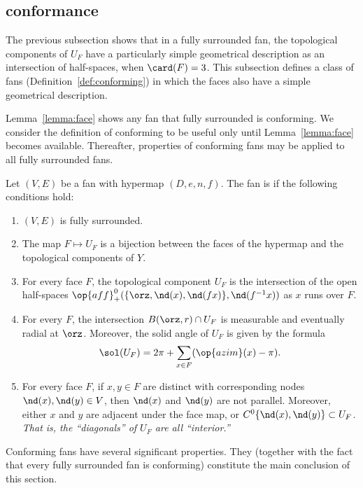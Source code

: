 \subsection{conformance}\label{sec:conformance}


The previous subsection shows that in a fully surrounded fan, the topological
components of $U_F$ have a particularly simple geometrical description as
an intersection of half-spaces, when $\card(F)=3$.  This subsection defines
a class of fans (Definition~\ref{def:conforming}) in which the faces also have
a  simple geometrical description.

Lemma~\ref{lemma:face} shows any fan that fully surrounded is
conforming.  We consider the definition of conforming to be
useful only until Lemma~\ref{lemma:face} becomes available.
Thereafter, properties of conforming fans may be applied to all fully
surrounded fans.

\begin{definition}[conforming]\label{def:conforming}
Let $(V,E)$ be a fan with hypermap $(D,e,n,f)$.  The fan is
 if the following conditions hold:
\begin{enumerate}
\item {} $(V,E)$ is fully surrounded.
\item {} The map $F\mapsto U_F$ is a bijection between
the faces of the hypermap and the topological components of $Y$.
\item {} For every face $F$, the topological component
$U_F$ is the intersection of the open half-spaces
$\op{aff}_+^0(\{\orz,\nd(x),\nd({f x})\},\nd(f^{-1} x))$ as $x$ runs over
$F$.\label{halfspace:conformance}
\item {} For every $F$, the intersection
$B(\orz,r)\cap U_F$ is measurable and eventually radial at $\orz$.
Moreover, the solid angle of $U_F$ is given by the formula
\[ 
\sol(U_F) = 2\pi + \sum_{x\in F}(\op{azim}(x)-\pi).
\] 
\item {} For every face $F$, if $x,y\in F$ are distinct
with corresponding nodes $\nd(x),\nd(y)\in V$, then $\nd(x)$ and
$\nd(y)$ are not parallel.  Moreover, either $x$ and $y$ are adjacent under
the face map, or $C^0\{\nd(x),\nd(y)\}\subset U_F$.  {\it That is, the
``diagonals'' of $U_F$ are all ``interior.''}
\end{enumerate}
\end{definition}


Conforming fans have several significant properties.   They
(together with the fact that every fully surrounded fan is conforming) constitute
the main conclusion of this section.  

